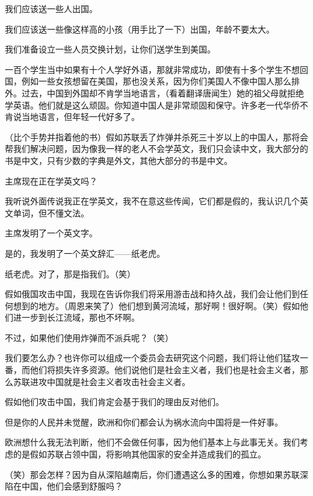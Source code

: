 我们应该送一些人出国。

我们应该送一些像这样高的小孩（用手比了一下）出国，年龄不要太大。

我们准备设立一些人员交换计划，让你们送学生到美国。

一百个学生当中如果有十个人学好外语，那就非常成功，即使有十多个学生不想回国，例如一些女孩想留在美国，那也没关系，因为你们美国人不像中国人那么排外。过去，中国到外国却不肯学当地语言，（看着翻译唐闻生）她的祖父母就拒绝学英语。他们就是这么顽固。你知道中国人是非常顽固和保守。许多老一代华侨不肯说当地语言，但年轻一代好多了。

（比个手势并指着他的书）假如苏联丢了炸弹并杀死三十岁以上的中国人，那将会帮我们解决问题，因为像我一样的老人不会学英文，我们只会读中文，我大部分的书是中文，只有少数的字典是外文，其他大部分的书是中文。

主席现在正在学英文吗？

我听说外面传说我正在学英文，我不在意这些传闻，它们都是假的，我认识几个英文单词，但不懂文法。

主席发明了一个英文字。

是的，我发明了一个英文辞汇——纸老虎。

纸老虎。对了，那是指我们。（笑）

假如俄国攻击中国，我现在告诉你我们将采用游击战和持久战，我们会让他们到任何想到的地方。（周恩来笑了）他们想到黄河流域，那好啊！很好啊。（笑）假如他们进一步到长江流域，那也不坏啊。

不过，如果他们使用炸弹而不派兵呢？（笑）

我们要怎么办？也许你可以组成一个委员会去研究这个问题，我们将让他们猛攻一番，而他们将损失许多资源。他们说他们是社会主义者，我们也是社会主义者，那么苏联进攻中国就是社会主义者攻击社会主义者。

假如他们攻击中国，我们肯定会基于我们的理由反对他们。

但是你的人民并未觉醒，欧洲和你们都会认为祸水流向中国将是一件好事。

欧洲想什么我无法判断，他们不会做任何事，因为他们基本上与此事无关。我们考虑的是假如苏联占领中国，将影响其他国家的安全并造成我们的孤立。

（笑）那会怎样？因为自从深陷越南后，你们遭遇这么多的困难，你想如果苏联深陷在中国，他们会感到舒服吗？

